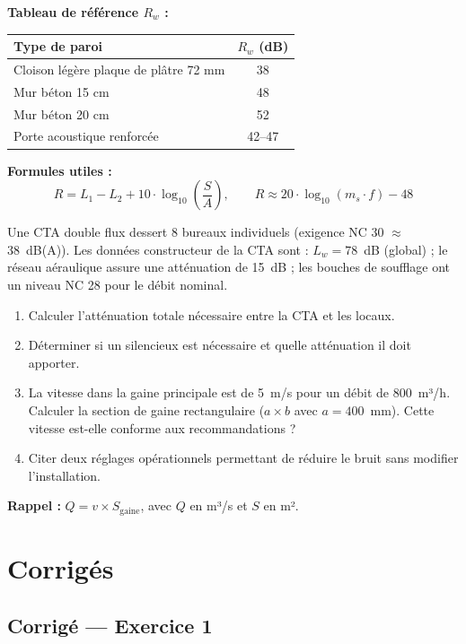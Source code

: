 \textbf{Tableau de référence $R_w$ :}
\begin{center}
\begin{tabular}{lc}
\toprule
Type de paroi & $R_w$ (dB) \\
\midrule
Cloison légère plaque de plâtre 72 mm & 38 \\
Mur béton 15 cm & 48 \\
Mur béton 20 cm & 52 \\
Porte acoustique renforcée & 42--47 \\
\bottomrule
\end{tabular}
\end{center}

\textbf{Formules utiles :}
\[
  R = L_1 - L_2 + 10 \cdot \log_{10}\!\left(\frac{S}{A}\right), \qquad R \approx 20 \cdot \log_{10}(m_s \cdot f) - 48
\]


Une CTA double flux dessert 8 bureaux individuels (exigence NC 30 $\approx$ 38~dB(A)). Les données constructeur de la CTA sont : $L_w = 78$~dB (global) ; le réseau aéraulique assure une atténuation de 15~dB ; les bouches de soufflage ont un niveau NC 28 pour le débit nominal.

\begin{enumerate}
  \item Calculer l'atténuation totale nécessaire entre la CTA et les locaux.
  \item Déterminer si un silencieux est nécessaire et quelle atténuation il doit apporter.
  \item La vitesse dans la gaine principale est de 5~m/s pour un débit de 800~m³/h. Calculer la section de gaine rectangulaire ($a \times b$ avec $a = 400$~mm). Cette vitesse est-elle conforme aux recommandations ?
  \item Citer deux réglages opérationnels permettant de réduire le bruit sans modifier l'installation.
\end{enumerate}

\textbf{Rappel :} $Q = v \times S_{\text{gaine}}$, avec $Q$ en m³/s et $S$ en m².

\newpage
\section*{Corrigés}

\subsection*{Corrigé — Exercice 1}


